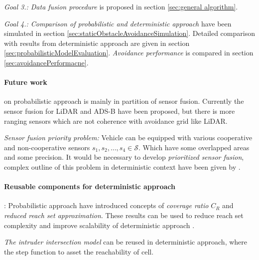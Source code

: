 \emph{Goal 3.: Data fusion procedure} is proposed in section \ref{sec:general algorithm}.

\emph{Goal 4.: Comparison of probabilistic and deterministic approach} have been simulated in section \ref{sec:staticObstacleAvoidanceSimulation}. Detailed comparison with results from deterministic approach \cite{alojzgomola2017} are given in section \ref{sec:probabilisticModelEvaluation}. \emph{Avoidance performance} is compared in section \ref{sec:avoidancePerformacne}.

\paragraph{Future work} on probabilistic approach is mainly in partition of sensor fusion. Currently the sensor fusion for LiDAR and ADS-B have been proposed, but there is more ranging sensors which are not coherence with avoidance grid like LiDAR. 

\emph{Sensor fusion priority problem:} Vehicle can be equipped with various cooperative and non-cooperative sensors $s_1,s_2,\dots,s_4\in\mathscr{S}$. Which have some overlapped areas and some precision. It would be necessary to develop \emph{prioritized sensor fusion}, complex outline of this problem in deterministic context have been given by \cite{xiong2002multi}.

\paragraph{Reusable components for deterministic approach}: Probabilistic approach have introduced concepts of \emph{coverage ratio} $C_R$ and \emph{reduced reach set approximation}. These results can be used to reduce reach set complexity and improve scalability of deterministic approach \cite{alojzgomola2017}.

\emph{The intruder intersection model} can be reused in deterministic approach, where the step function to asset the reachability of cell. 
